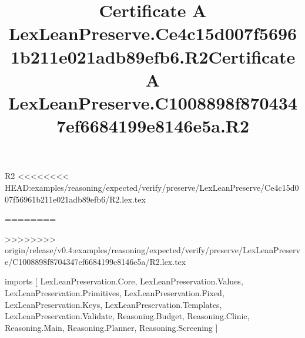 \begin{lexlean}{R2}
<<<<<<<< HEAD:examples/reasoning/expected/verify/preserve/LexLeanPreserve/Ce4c15d007f56961b211e021adb89efb6/R2.lex.tex
\title{Certificate A LexLeanPreserve.Ce4c15d007f56961b211e021adb89efb6.R2}
========
\title{Certificate A LexLeanPreserve.C1008898f8704347ef6684199e8146e5a.R2}
>>>>>>>> origin/release/v0.4:examples/reasoning/expected/verify/preserve/LexLeanPreserve/C1008898f8704347ef6684199e8146e5a/R2.lex.tex
\begin{coremodule}
imports [
  LexLeanPreservation.Core,
  LexLeanPreservation.Values,
  LexLeanPreservation.Primitives,
  LexLeanPreservation.Fixed,
  LexLeanPreservation.Keys,
  LexLeanPreservation.Templates,
  LexLeanPreservation.Validate,
  Reasoning.Budget,
  Reasoning.Clinic,
  Reasoning.Main,
  Reasoning.Planner,
  Reasoning.Screening
]


\end{coremodule}
\end{lexlean}
